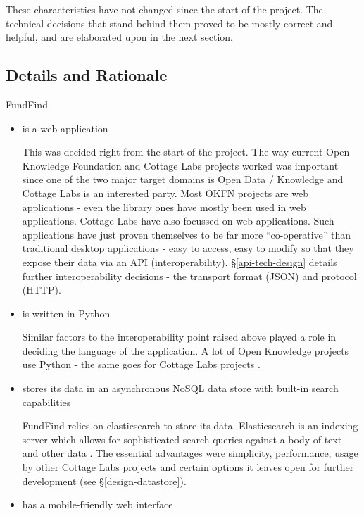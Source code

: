 These characteristics have not changed since the start of the project. The technical decisions that stand behind them proved to be mostly correct and helpful, and are elaborated upon in the next section.

\subsection{Details and Rationale}
\label{design-rationale}

FundFind
\begin{itemize}
 \item is a web application
 
This was decided right from the start of the project. The way current Open Knowledge Foundation and Cottage Labs projects worked was important since one of the two major target domains is Open Data / Knowledge and Cottage Labs is an interested party. Most OKFN projects are web applications - even the library ones have mostly been used in web applications. Cottage Labs have also focussed on web applications. Such applications have just proven themselves to be far more ``co-operative'' than traditional desktop applications - easy to access, easy to modify so that they expose their data via an API (interoperability). \S\ref{api-tech-design} details further interoperability decisions - the transport format (JSON) and protocol (HTTP).
 
 \item is written in Python

Similar factors to the interoperability point raised above played a role in deciding the language of the application. A lot of Open Knowledge projects use Python \cite{nomenklatura, offenesparlament, pybossa, activityapi} - the same goes for Cottage Labs projects \cite{leaps, portality, iioa, artemis, cl-web-code, xcri, negotiator}.
 
 \item stores its data in an asynchronous NoSQL data store with built-in search capabilities
 
 FundFind relies on elasticsearch to store its data. Elasticsearch is an indexing server which allows for sophisticated search queries against a body of text and other data \cite{es}. The essential advantages were simplicity, performance, usage by other Cottage Labs projects and certain options it leaves open for further development (see \S\ref{design-datastore}).
 
 \item has a mobile-friendly web interface
 

\end{itemize}
